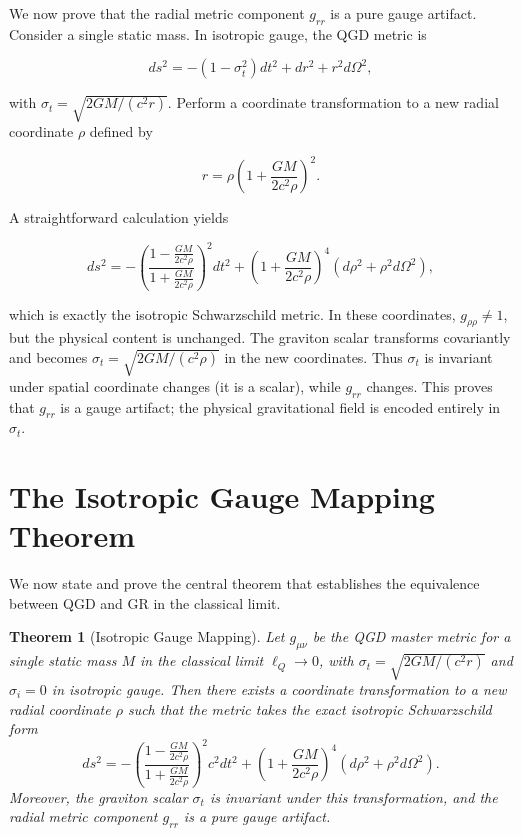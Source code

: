 \documentclass[12pt,prd,preprintnumbers,amsmath,amssymb]{revtex4-2}
\newtheorem{theorem}{Theorem}[section]
\theoremstyle{definition}
\theoremstyle{remark}
\begin{document}
We now prove that the radial metric component $g_{rr}$ is a pure gauge artifact. Consider a single static mass. In isotropic gauge, the QGD metric is

\[
ds^2 = -(1 - \sigma_t^2) dt^2 + dr^2 + r^2 d\Omega^2,
\]

with $\sigma_t = \sqrt{2GM/(c^2 r)}$. Perform a coordinate transformation to a new radial coordinate $\rho$ defined by

\[
r = \rho\left(1 + \frac{GM}{2c^2\rho}\right)^2.
\]

A straightforward calculation yields

\[
ds^2 = -\left(\frac{1 - \frac{GM}{2c^2\rho}}{1 + \frac{GM}{2c^2\rho}}\right)^2 dt^2 + \left(1 + \frac{GM}{2c^2\rho}\right)^4 (d\rho^2 + \rho^2 d\Omega^2),
\]

which is exactly the isotropic Schwarzschild metric. In these coordinates, $g_{\rho\rho} \neq 1$, but the physical content is unchanged. The graviton scalar transforms covariantly and becomes $\sigma_t = \sqrt{2GM/(c^2\rho)}$ in the new coordinates. Thus $\sigma_t$ is invariant under spatial coordinate changes (it is a scalar), while $g_{rr}$ changes. This proves that $g_{rr}$ is a gauge artifact; the physical gravitational field is encoded entirely in $\sigma_t$.

\section{The Isotropic Gauge Mapping Theorem}

We now state and prove the central theorem that establishes the equivalence between QGD and GR in the classical limit.

\begin{theorem}[Isotropic Gauge Mapping]
\label{thm:isotropic}
Let $g_{\mu\nu}$ be the QGD master metric for a single static mass $M$ in the classical limit $\ell_Q \to 0$, with $\sigma_t = \sqrt{2GM/(c^2 r)}$ and $\sigma_i = 0$ in isotropic gauge. Then there exists a coordinate transformation to a new radial coordinate $\rho$ such that the metric takes the exact isotropic Schwarzschild form
\begin{equation}
ds^2 = -\left(\frac{1 - \frac{GM}{2c^2\rho}}{1 + \frac{GM}{2c^2\rho}}\right)^2 c^2 dt^2 + \left(1 + \frac{GM}{2c^2\rho}\right)^4 (d\rho^2 + \rho^2 d\Omega^2).
\end{equation}
Moreover, the graviton scalar $\sigma_t$ is invariant under this transformation, and the radial metric component $g_{rr}$ is a pure gauge artifact.
\end{theorem}
\end{document}
